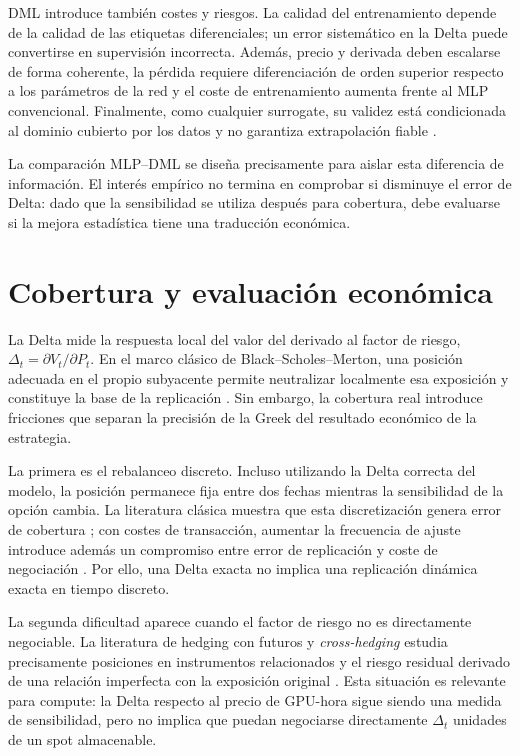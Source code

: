DML introduce también costes y riesgos. La calidad del entrenamiento depende de la
calidad de las etiquetas diferenciales; un error sistemático en la Delta puede
convertirse en supervisión incorrecta. Además, precio y derivada deben escalarse de
forma coherente, la pérdida requiere diferenciación de orden superior respecto a los
parámetros de la red y el coste de entrenamiento aumenta frente al MLP
convencional. Finalmente, como cualquier surrogate, su validez está condicionada al
dominio cubierto por los datos y no garantiza extrapolación fiable
\cite{huge_savine_2020}.

La comparación MLP--DML se diseña precisamente para aislar esta diferencia de
información. El interés empírico no termina en comprobar si disminuye el error de
Delta: dado que la sensibilidad se utiliza después para cobertura, debe evaluarse si
la mejora estadística tiene una traducción económica.

\section{Cobertura y evaluación económica}
\label{sec:hedging_literature}

La Delta mide la respuesta local del valor del derivado al factor de riesgo,
$\Delta_t=\partial V_t/\partial P_t$. En el marco clásico de
Black--Scholes--Merton, una posición adecuada en el propio subyacente permite
neutralizar localmente esa exposición y constituye la base de la replicación
\cite{black_scholes_1973,merton_1973}. Sin embargo, la cobertura real introduce
fricciones que separan la precisión de la Greek del resultado económico de la
estrategia.

La primera es el rebalanceo discreto. Incluso utilizando la Delta correcta del
modelo, la posición permanece fija entre dos fechas mientras la sensibilidad de la
opción cambia. La literatura clásica muestra que esta discretización genera error
de cobertura \cite{boyle_emanuel_1980}; con costes de transacción, aumentar la
frecuencia de ajuste introduce además un compromiso entre error de replicación y
coste de negociación \cite{leland1985}. Por ello, una Delta exacta no implica una
replicación dinámica exacta en tiempo discreto.

La segunda dificultad aparece cuando el factor de riesgo no es directamente
negociable. La literatura de hedging con futuros y \textit{cross-hedging} estudia
precisamente posiciones en instrumentos relacionados y el riesgo residual derivado
de una relación imperfecta con la exposición original
\cite{ederington1979,anderson_danthine_1981}. Esta situación es relevante para
compute: la Delta respecto al precio de GPU-hora sigue siendo una medida de
sensibilidad, pero no implica que puedan negociarse directamente
$\Delta_t$ unidades de un spot almacenable.

